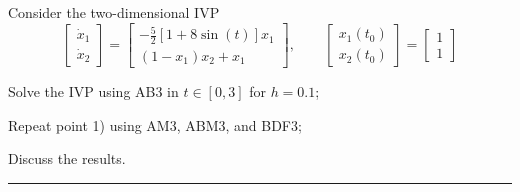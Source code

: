 \documentclass[11pt,a4paper,oneside]{article}
\begin{document}
Consider the two-dimensional IVP 
\[\begin{bmatrix}\dot{x}_1 \\ \dot{x}_2\end{bmatrix}=\begin{bmatrix}-\frac{5}{2}\left[1+8\sin(t)\right]x_1 \\ (1-x_1)x_2+x_1\end{bmatrix}, \qquad \begin{bmatrix} x_1(t_0)\\ x_2(t_0)\end{bmatrix}=\begin{bmatrix} 1\\ 1\end{bmatrix}\]
\begin{enumerate*}[label=\arabic*)]
    \item Solve the IVP using AB3 in $t\in[0,3]$ for $h=0.1$;
    \item Repeat point 1) using AM3, ABM3, and BDF3;
    \item Discuss the results.
\end{enumerate*}

\medskip \hrule \medskip
\end{document}
